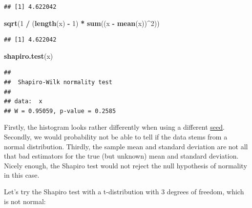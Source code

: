 \documentclass[
]{book}
\newenvironment{Shaded}{\begin{snugshade}}{\end{snugshade}}
\newcommand{\DecValTok}[1]{\textcolor[rgb]{0.00,0.00,0.81}{#1}}
\newcommand{\FunctionTok}[1]{\textcolor[rgb]{0.13,0.29,0.53}{\textbf{#1}}}
\newcommand{\NormalTok}[1]{#1}
\newcommand{\SpecialCharTok}[1]{\textcolor[rgb]{0.81,0.36,0.00}{\textbf{#1}}}
\begin{document}
\begin{verbatim}
## [1] 4.622042
\end{verbatim}

\begin{Shaded}
\begin{Highlighting}[]
\FunctionTok{sqrt}\NormalTok{(}\DecValTok{1} \SpecialCharTok{/}\NormalTok{ (}\FunctionTok{length}\NormalTok{(x) }\SpecialCharTok{{-}} \DecValTok{1}\NormalTok{) }\SpecialCharTok{*} \FunctionTok{sum}\NormalTok{((x }\SpecialCharTok{{-}} \FunctionTok{mean}\NormalTok{(x))}\SpecialCharTok{\^{}}\DecValTok{2}\NormalTok{))}
\end{Highlighting}
\end{Shaded}

\begin{verbatim}
## [1] 4.622042
\end{verbatim}

\begin{Shaded}
\begin{Highlighting}[]
\FunctionTok{shapiro.test}\NormalTok{(x)}
\end{Highlighting}
\end{Shaded}

\begin{verbatim}
## 
##  Shapiro-Wilk normality test
## 
## data:  x
## W = 0.95059, p-value = 0.2585
\end{verbatim}

Firstly, the histogram looks rather differently when using a different \href{https://r-coder.com/set-seed-r/}{seed}. Secondly, we would probability
not be able to tell if the data stems from a normal distribution. Thirdly, the sample mean and standard deviation
are not all that bad estimators for the true (but unknown) mean and standard deviation. Nicely enough,
the Shapiro test would not reject the null hypothesis of normality in this case.

Let's try the Shapiro test with a t-distribution with 3 degrees of freedom, which is not normal:
\end{document}
